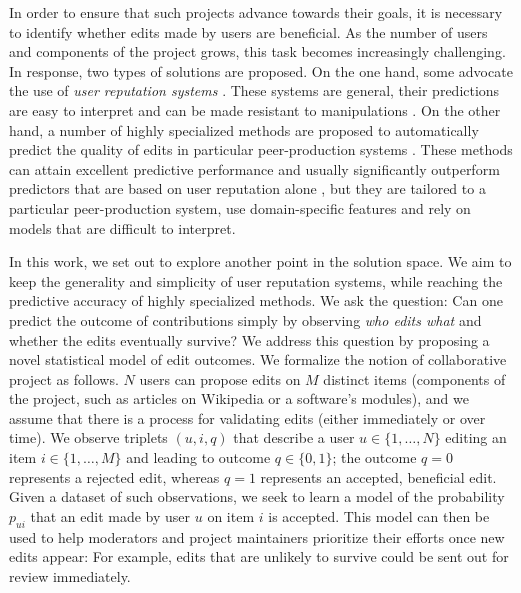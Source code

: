 \documentclass[format=sigconf]{acmart}
\begin{document}
In order to ensure that such projects advance towards their goals, it is necessary to identify whether edits made by users are beneficial.
As the number of users and components of the project grows, this task becomes increasingly challenging.
In response, two types of solutions are proposed.
On the one hand, some advocate the use of \emph{user reputation systems} \citep{resnick2000reputation, adler2007content}.
These systems are general, their predictions are easy to interpret and can be made resistant to manipulations \citep{dealfaro2013content}.
On the other hand, a number of highly specialized methods are proposed to automatically predict the quality of edits in particular peer-production systems \citep{druck2008learning, wikimedia2015artificial}.
These methods can attain excellent predictive performance \citep{heindorf2016vandalism} and usually significantly outperform predictors that are based on user reputation alone \citep{druck2008learning}, but they are tailored to a particular peer-production system, use domain-specific features and rely on models that are difficult to interpret.

In this work, we set out to explore another point in the solution space.
We aim to keep the generality and simplicity of user reputation systems, while reaching the predictive accuracy of highly specialized methods.
We ask the question:
Can one predict the outcome of contributions simply by observing \emph{who edits what} and whether the edits eventually survive?
We address this question by proposing a novel statistical model of edit outcomes.
We formalize the notion of collaborative project as follows.
$N$ users can propose edits on $M$ distinct items (components of the project, such as articles on Wikipedia or a software's modules), and we assume that there is a process for validating edits (either immediately or over time).
We observe triplets $(u, i, q)$ that describe a user $u \in \{1, \ldots, N\}$ editing an item $i \in \{1, \ldots, M\}$ and leading to outcome $q \in \{0, 1\}$;
the outcome $q = 0$ represents a rejected edit, whereas $q = 1$ represents an accepted, beneficial edit.
Given a dataset of such observations, we seek to learn a model of the probability $p_{ui}$ that an edit made by user $u$ on item $i$ is accepted.
This model can then be used to help moderators and project maintainers prioritize their efforts once new edits appear:
For example, edits that are unlikely to survive could be sent out for review immediately.
\end{document}
